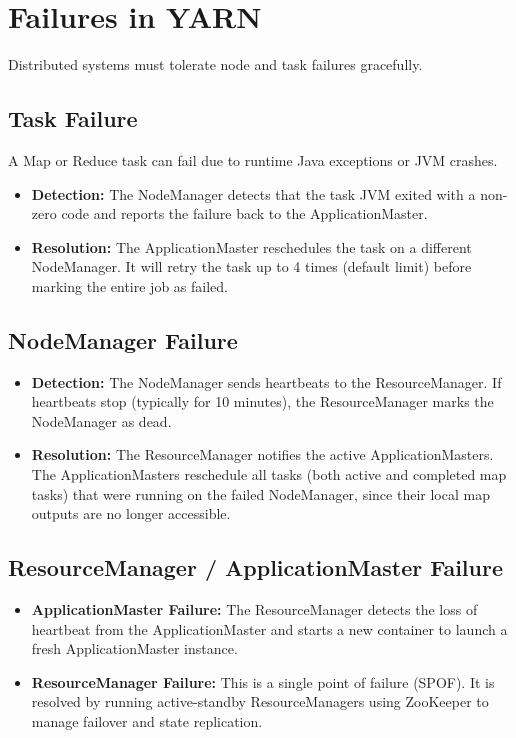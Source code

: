 \documentclass[12pt,a4paper]{article}
\begin{document}
\section{Failures in YARN}

Distributed systems must tolerate node and task failures gracefully.

\subsection{Task Failure}
A Map or Reduce task can fail due to runtime Java exceptions or JVM crashes.
\begin{itemize}[leftmargin=*, itemsep=3pt]
  \item \textbf{Detection:} The NodeManager detects that the task JVM exited with a non-zero code and reports the failure back to the ApplicationMaster.
  \item \textbf{Resolution:} The ApplicationMaster reschedules the task on a different NodeManager. It will retry the task up to 4 times (default limit) before marking the entire job as failed.
\end{itemize}

\subsection{NodeManager Failure}
\begin{itemize}[leftmargin=*, itemsep=3pt]
  \item \textbf{Detection:} The NodeManager sends heartbeats to the ResourceManager. If heartbeats stop (typically for 10 minutes), the ResourceManager marks the NodeManager as dead.
  \item \textbf{Resolution:} The ResourceManager notifies the active ApplicationMasters. The ApplicationMasters reschedule all tasks (both active and completed map tasks) that were running on the failed NodeManager, since their local map outputs are no longer accessible.
\end{itemize}

\subsection{ResourceManager / ApplicationMaster Failure}
\begin{itemize}[leftmargin=*, itemsep=3pt]
  \item \textbf{ApplicationMaster Failure:} The ResourceManager detects the loss of heartbeat from the ApplicationMaster and starts a new container to launch a fresh ApplicationMaster instance.
  \item \textbf{ResourceManager Failure:} This is a single point of failure (SPOF). It is resolved by running active-standby ResourceManagers using ZooKeeper to manage failover and state replication.
\end{itemize}
\end{document}
